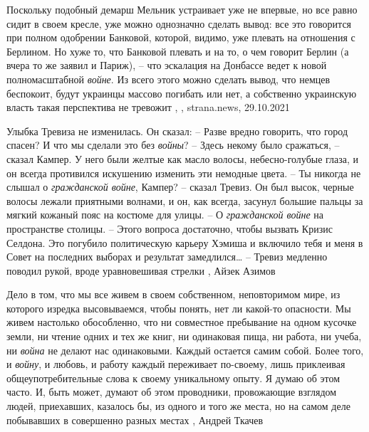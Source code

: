 Поскольку подобный демарш Мельник устраивает уже не впервые, но все равно сидит
в своем кресле, уже можно однозначно сделать вывод: все это говорится при
полном одобрении Банковой, которой, видимо, уже плевать на отношения с
Берлином.  Но хуже то, что Банковой плевать и на то, о чем говорит Берлин (а
вчера то же заявил и Париж), – что эскалация на Донбассе ведет к новой
полномасштабной \emph{войне}. Из всего этого можно сделать вывод, что немцев
беспокоит, будут украинцы массово погибать или нет, а собственно украинскую
власть такая перспектива не тревожит
, 
, strana.news, 29.10.2021

Улыбка Тревиза не изменилась. Он сказал: – Разве вредно говорить, что город
спасен? И что мы сделали это без \emph{войны}?  – Здесь некому было сражаться,
– сказал Кампер. У него были желтые как масло волосы, небесно-голубые глаза, и
он всегда противился искушению изменить эти немодные цвета.  – Ты никогда не
слышал о \emph{гражданской войне}, Кампер? – сказал Тревиз. Он был высок,
черные волосы лежали приятными волнами, и он, как всегда, засунул большие
пальцы за мягкий кожаный пояс на костюме для улицы.  – О \emph{гражданской
войне} на пространстве столицы.  – Этого вопроса достаточно, чтобы вызвать
Кризис Селдона. Это погубило политическую карьеру Хэмиша и включило тебя и меня
в Совет на последних выборах и результат замедлился… – Тревиз медленно поводил
рукой, вроде уравновешивая стрелки
, Айзек Азимов

Дело в том, что мы все живем в своем собственном, неповторимом мире, из
которого изредка высовываемся, чтобы понять, нет ли какой-то опасности. Мы
живем настолько обособленно, что ни совместное пребывание на одном кусочке
земли, ни чтение одних и тех же книг, ни одинаковая пища, ни работа, ни учеба,
ни \emph{война} не делают нас одинаковыми. Каждый остается самим собой. Более того, и
\emph{войну}, и любовь, и работу каждый переживает по-своему, лишь приклеивая
общеупотребительные слова к своему уникальному опыту.  Я думаю об этом часто.
И, быть может, думают об этом проводники, провожающие взглядом людей,
приехавших, казалось бы, из одного и того же места, но на самом деле побывавших
в совершенно разных местах
, Андрей Ткачев

